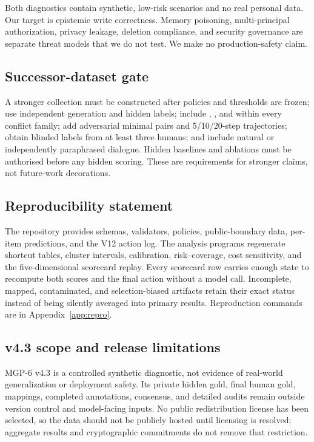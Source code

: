 Both diagnostics contain synthetic, low-risk scenarios and no real personal
data. Our target is epistemic write correctness. Memory poisoning,
multi-principal authorization, privacy leakage, deletion compliance, and
security governance are separate threat models that we do not test. We make no
production-safety claim.

\subsection{Successor-dataset gate}

A stronger collection must be constructed after policies and thresholds are
frozen; use independent generation and hidden labels; include \keep,
\supersede, and \abstain{} within every conflict family; add adversarial minimal
pairs and 5/10/20-step trajectories; obtain blinded labels from at least three
humans; and include natural or independently paraphrased dialogue. Hidden
baselines and ablations must be authorised before any hidden scoring. These are
requirements for stronger claims, not future-work decorations.

\subsection{Reproducibility statement}

The repository provides schemas, validators, policies, public-boundary data,
per-item predictions, and the V12 action log. The analysis programs regenerate shortcut
tables, cluster intervals, calibration, risk--coverage, cost sensitivity, and
the five-dimensional scorecard replay. Every scorecard row carries enough state
to recompute both scores and the final action without a model call. Incomplete,
mapped, contaminated, and selection-biased artifacts retain their exact status
instead of being silently averaged into primary results. Reproduction commands
are in Appendix~\ref{app:repro}.

\subsection{v4.3 scope and release limitations}

MGP-6 v4.3 is a controlled synthetic diagnostic, not evidence of real-world
generalization or deployment safety. Its private hidden gold, final human gold,
mappings, completed annotations, consensus, and detailed audits remain outside
version control and model-facing inputs. No public redistribution license has
been selected, so the data should not be publicly hosted until licensing is
resolved; aggregate results and cryptographic commitments do not remove that
restriction.
